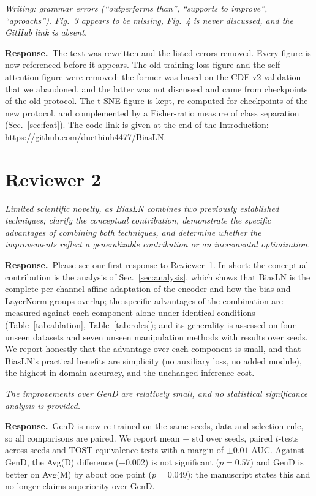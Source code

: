 \documentclass[11pt]{article}
\newenvironment{comment}{\par\medskip\noindent\begin{minipage}{\linewidth}\color{black!70}\itshape}{\end{minipage}\par\smallskip}
\newcommand{\resp}{\noindent\textbf{Response.}~}
\begin{document}
\begin{comment}
Writing: grammar errors (``outperforms than'', ``supports to improve'', ``aproachs''). Fig.~3 appears to be missing, Fig.~4 is never discussed, and the GitHub link is absent.
\end{comment}
\resp The text was rewritten and the listed errors removed. Every figure is now referenced before it appears. The old training-loss figure and the self-attention figure were removed: the former was based on the CDF-v2 validation that we abandoned, and the latter was not discussed and came from checkpoints of the old protocol. The t-SNE figure is kept, re-computed for checkpoints of the new protocol, and complemented by a Fisher-ratio measure of class separation (Sec.~\ref{sec:feat}). The code link is given at the end of the Introduction: \url{https://github.com/ducthinh4477/BiasLN}.

\section*{Reviewer 2}

\begin{comment}
Limited scientific novelty, as BiasLN combines two previously established techniques; clarify the conceptual contribution, demonstrate the specific advantages of combining both techniques, and determine whether the improvements reflect a generalizable contribution or an incremental optimization.
\end{comment}
\resp Please see our first response to Reviewer~1. In short: the conceptual contribution is the analysis of Sec.~\ref{sec:analysis}, which shows that BiasLN is the complete per-channel affine adaptation of the encoder and how the bias and LayerNorm groups overlap; the specific advantages of the combination are measured against each component alone under identical conditions (Table~\ref{tab:ablation}, Table~\ref{tab:roles}); and its generality is assessed on four unseen datasets and seven unseen manipulation methods with results over seeds. We report honestly that the advantage over each component is small, and that BiasLN's practical benefits are simplicity (no auxiliary loss, no added module), the highest in-domain accuracy, and the unchanged inference cost.

\begin{comment}
The improvements over GenD are relatively small, and no statistical significance analysis is provided.
\end{comment}
\resp GenD is now re-trained on the same seeds, data and selection rule, so all comparisons are paired. We report mean $\pm$ std over seeds, paired $t$-tests across seeds and TOST equivalence tests with a margin of $\pm0.01$ AUC. Against GenD, the Avg(D) difference ($-0.002$) is not significant ($p=0.57$) and GenD is better on Avg(M) by about one point ($p=0.049$); the manuscript states this and no longer claims superiority over GenD.
\end{document}
